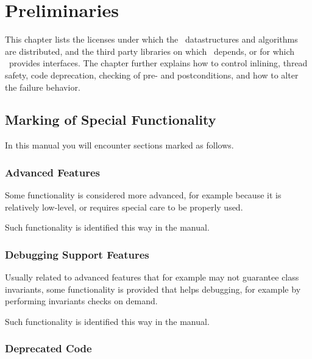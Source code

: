 
\chapter{Preliminaries}


This chapter lists the licenses
under which the \cgal\ datastructures and algorithms are distributed,
and the third party libraries on which \cgal\ depends, or for which
\cgal\ provides interfaces.  The chapter further explains how to control
inlining, thread safety, code deprecation, checking of pre- and postconditions,
and how to alter the failure behavior. 






\section{Marking of Special Functionality}

In this manual you will encounter sections marked as follows.

\subsection{Advanced Features}

Some functionality is considered more advanced, for example because it is
relatively low-level, or requires special care to be properly used.

\begin{ccAdvanced}
Such functionality is identified this way in the manual.
\end{ccAdvanced}

\subsection{Debugging Support Features}

Usually related to advanced features that for example may not guarantee
class invariants, some functionality is provided that helps debugging,
for example by performing invariants checks on demand.

\begin{ccDebug}
Such functionality is identified this way in the manual.
\end{ccDebug}

\subsection{Deprecated Code}

